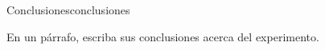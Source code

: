 \begin{problem}{Conclusiones}{conclusiones}

En un párrafo, escriba sus conclusiones acerca del experimento.

\end{problem}